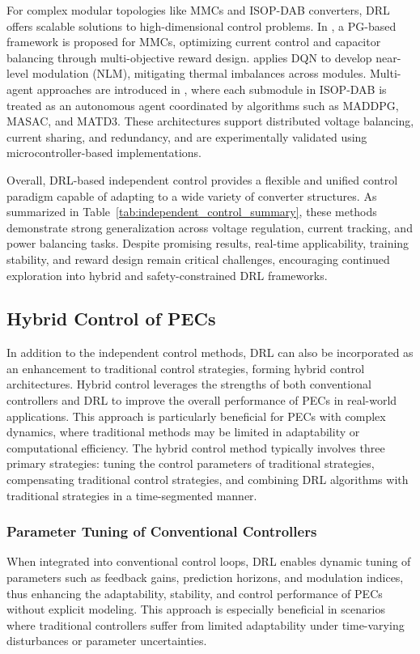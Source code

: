 For complex modular topologies like MMCs and ISOP-DAB converters, DRL offers scalable solutions to high-dimensional control problems. In \cite{jiang2021application}, a PG-based framework is proposed for MMCs, optimizing current control and capacitor balancing through multi-objective reward design. \cite{jung2022reinforcement} applies DQN to develop near-level modulation (NLM), mitigating thermal imbalances across modules. Multi-agent approaches are introduced in \cite{zeng2021deep, zeng2022multiagent, zeng2022autonomous,zeng2023deep}, where each submodule in ISOP-DAB is treated as an autonomous agent coordinated by algorithms such as MADDPG, MASAC, and MATD3. These architectures support distributed voltage balancing, current sharing, and redundancy, and are experimentally validated using microcontroller-based implementations.

Overall, DRL-based independent control provides a flexible and unified control paradigm capable of adapting to a wide variety of converter structures. As summarized in Table~\ref{tab:independent_control_summary}, these methods demonstrate strong generalization across voltage regulation, current tracking, and power balancing tasks. Despite promising results, real-time applicability, training stability, and reward design remain critical challenges, encouraging continued exploration into hybrid and safety-constrained DRL frameworks.

\subsection{Hybrid Control of PECs}
\label{sec:ctrl_hybrid}
In addition to the independent control methods, DRL can also be incorporated as an enhancement to traditional control strategies, forming hybrid control architectures. Hybrid control leverages the strengths of both conventional controllers and DRL to improve the overall performance of PECs in real-world applications. This approach is particularly beneficial for PECs with complex dynamics, where traditional methods may be limited in adaptability or computational efficiency. The hybrid control method typically involves three primary strategies: tuning the control parameters of traditional strategies, compensating traditional control strategies, and combining DRL algorithms with traditional strategies in a time-segmented manner. 

\subsubsection{Parameter Tuning of Conventional Controllers}
When integrated into conventional control loops, DRL enables dynamic tuning of parameters such as feedback gains, prediction horizons, and modulation indices, thus enhancing the adaptability, stability, and control performance of PECs without explicit modeling. This approach is especially beneficial in scenarios where traditional controllers suffer from limited adaptability under time-varying disturbances or parameter uncertainties.

